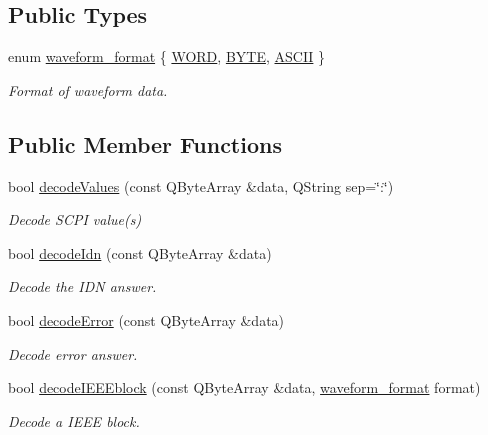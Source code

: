 \subsection*{Public Types}
\begin{DoxyCompactItemize}
\item 
enum \hyperlink{classmdt_frame_codec_scpi_a1aafb008a4207cc922f46fe905b3f17d}{waveform\_\-format} \{ \hyperlink{classmdt_frame_codec_scpi_a1aafb008a4207cc922f46fe905b3f17da7f4b47afe74504dea43bb04c8c6fbe58}{WORD}, 
\hyperlink{classmdt_frame_codec_scpi_a1aafb008a4207cc922f46fe905b3f17daad91226f87cea7fab38f5cc7618f424c}{BYTE}, 
\hyperlink{classmdt_frame_codec_scpi_a1aafb008a4207cc922f46fe905b3f17da957445cd510a5c4e6964e9b79e73af4d}{ASCII}
 \}
\begin{DoxyCompactList}\small\item\em Format of waveform data. \end{DoxyCompactList}\end{DoxyCompactItemize}
\subsection*{Public Member Functions}
\begin{DoxyCompactItemize}
\item 
bool \hyperlink{classmdt_frame_codec_scpi_a37a1703b6daee6f6bf91c6afb46191b3}{decodeValues} (const QByteArray \&data, QString sep=\char`\"{}:\char`\"{})
\begin{DoxyCompactList}\small\item\em Decode SCPI value(s) \end{DoxyCompactList}\item 
bool \hyperlink{classmdt_frame_codec_scpi_a6ddd1b8e23252dc7f03c279a030cb36f}{decodeIdn} (const QByteArray \&data)
\begin{DoxyCompactList}\small\item\em Decode the IDN answer. \end{DoxyCompactList}\item 
bool \hyperlink{classmdt_frame_codec_scpi_a9e38d8afadc7ff37821620feea6b0899}{decodeError} (const QByteArray \&data)
\begin{DoxyCompactList}\small\item\em Decode error answer. \end{DoxyCompactList}\item 
bool \hyperlink{classmdt_frame_codec_scpi_a0123b42b9e351b0ef3c13d34a5c4d45e}{decodeIEEEblock} (const QByteArray \&data, \hyperlink{classmdt_frame_codec_scpi_a1aafb008a4207cc922f46fe905b3f17d}{waveform\_\-format} format)
\begin{DoxyCompactList}\small\item\em Decode a IEEE block. \end{DoxyCompactList}\end{DoxyCompactItemize}
